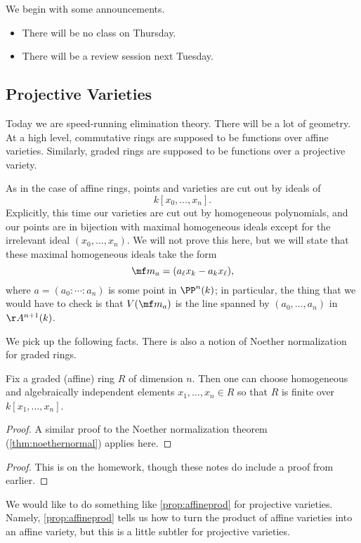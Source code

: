 
We begin with some announcements.
\begin{itemize}
	\item There will be no class on Thursday.
	\item There will be a review session next Tuesday.
\end{itemize}

\subsection{Projective Varieties}
Today we are speed-running elimination theory. There will be a lot of geometry. At a high level, commutative rings are supposed to be functions over affine varieties. Similarly, graded rings are supposed to be functions over a projective variety.

As in the case of affine rings, points and varieties are cut out by ideals of
\[k[x_0,\ldots,x_n].\]
Explicitly, this time our varieties are cut out by homogeneous polynomials, and our points are in bijection with maximal homogeneous ideals except for the irrelevant ideal $(x_0,\ldots,x_n)$. We will not prove this here, but we will state that these maximal homogeneous ideals take the form
\[\mf m_a=(a_\ell x_k-a_kx_\ell),\]
where $a=(a_0:\cdots:a_n)$ is some point in $\PP^n(k)$; in particular, the thing that we would have to check is that $V(\mf m_a)$ is the line spanned by $(a_0,\ldots,a_n)$ in $\AA^{n+1}(k)$.

We pick up the following facts.
\gradedassociatedprimeprop*
\noindent There is also a notion of Noether normalization for graded rings.
\begin{proposition}
	Fix a graded (affine) ring $R$ of dimension $n$. Then one can choose homogeneous and algebraically independent elements $x_1,\ldots,x_n\in R$ so that $R$ is finite over $k[x_1,\ldots,x_n]$.
\end{proposition}
\begin{proof}
	A similar proof to the Noether normalization theorem (\autoref{thm:noethernormal}) applies here.
\end{proof}
\productofaffinesprop*
\begin{proof}
	This is on the homework, though these notes do include a proof from earlier.
\end{proof}
We would like to do something like \autoref{prop:affineprod} for projective varieties. Namely, \autoref{prop:affineprod} tells us how to turn the product of affine varieties into an affine variety, but this is a little subtler for projective varieties.

